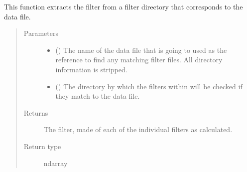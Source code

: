 \documentclass[letterpaper,10pt,english]{sphinxmanual}
\begin{document}
\begin{fulllineitems}
\label{\detokenize{docstrings/ifa_smeargle.analysis.base_functions:ifa_smeargle.analysis.base_functions.create_filter_from_directory}}
This function extracts the filter from a filter directory that
corresponds to the data file.
\begin{quote}\begin{description}
\item[{Parameters}] \leavevmode\begin{itemize}
\item {} 
 () \textendash{} The name of the data file that is going to used as the
reference to find any matching filter files. All directory
information is stripped.

\item {} 
 () \textendash{} The directory by which the filters within will be checked if
they match to the data file.

\end{itemize}

\item[{Returns}] \leavevmode
{} \textendash{} The filter, made of each of the individual filters as
calculated.

\item[{Return type}] \leavevmode
ndarray

\end{description}\end{quote}

\end{fulllineitems}

\end{document}
